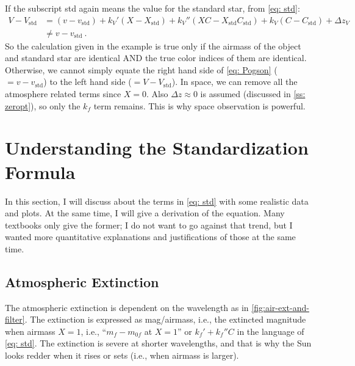 If the subscript std again means the value for the standard star, from \cref{eq: std}:
\begin{equation}
\begin{aligned}
  V - V_\mathrm{std}
    &= (v - v_\mathrm{std})
    + k_V'(X - X_\mathrm{std})
    + k_V''(X C - X_\mathrm{std} C_\mathrm{std})
    + k_V(C - C_\mathrm{std})
    + \Delta z_V\\
    &\neq v - v_\mathrm{std} ~.
\end{aligned}
\end{equation}
So the calculation given in the example is true only if the airmass of the object and standard star are identical AND the true color indices of them are identical. Otherwise, we cannot simply equate the right hand side of \cref{eq: Pogson} ($ = v - v_\mathrm{std} $) to the left hand side ($ = V - V_\mathrm{std} $). In space, we can remove all the atmosphere related terms since $ X = 0 $. Also $ \Delta z \approx 0 $ is assumed (discussed in \cref{ss: zeropt}), so only the $ k_f $ term remains. This is why space observation is powerful.

\section{Understanding the Standardization Formula}
In this section, I will discuss about the terms in \cref{eq: std} with some realistic data and plots. At the same time, I will give a derivation of the equation. Many textbooks only give the former; I do not want to go against that trend, but I wanted more quantitative explanations and justifications of those at the same time. 

\subsection{Atmospheric Extinction}
The atmospheric extinction is dependent on the wavelength as in \cref{fig:air-ext-and-filter}. The extinction is expressed as mag/airmass, i.e., the extincted magnitude when airmass $ X = 1 $, i.e., ``$ m_f - m_{0f} $ at $ X = 1 $'' or $ k_f' + k_f''C $ in the language of \cref{eq: std}. The extinction is severe at shorter wavelengths, and that is why the Sun looks redder when it rises or sets (i.e., when airmass is larger). 

